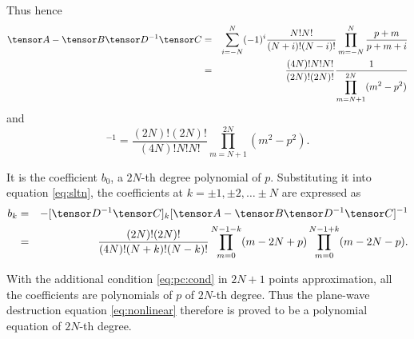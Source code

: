 Thus hence
\begin{eqnarray}
\mtx A-\mtx B\mtx D^{-1}\mtx C &=&
\sum_{i=-N}^N
(-1)^{i}\frac{N!N!}{(N+i)!(N-i)!}
\prod_{m=-N}^N \frac{p+m}{p+m+i}
\nonumber \\ &=&
\frac{(4N)!N!N!}
{(2N)!(2N)!}
\frac{1}{
\displaystyle{\prod_{m=N+1}^{2N}(m^2-p^2)}}
\end{eqnarray}
and
\begin{equation}
[\mtx A-\mtx B\mtx D^{-1}\mtx C]^{-1} =
\frac{(2N)!(2N)!}{(4N)!N!N!}
\prod_{m=N+1}^{2N}(m^2-p^2).
\end{equation}

It is the coefficient $b_0$, a $2N$-th degree polynomial of $p$.
Substituting it into equation \ref{eq:sltn},
the coefficients at $k=\pm 1,\pm 2,\dots \pm N$ are expressed as
\begin{eqnarray}
b_k &= &
-[\mtx D^{-1}\mtx C]_k
[\mtx A-\mtx B\mtx D^{-1}\mtx C]^{-1}
\nonumber \\ &=&
\frac{(2N)!(2N)!}{(4N)!(N+k)!(N-k)!}
\prod_{m=0}^{N-1-k}(m-2N+p)
\prod_{m=0}^{N-1+k}(m-2N-p).
\end{eqnarray}

With the additional condition \ref{eq:pc:cond} in $2N+1$ points approximation,
all the coefficients are polynomials of $p$ of $2N$-th degree.
Thus the plane-wave destruction equation \ref{eq:nonlinear} 
therefore is proved to be a polynomial equation of $2N$-th degree.







